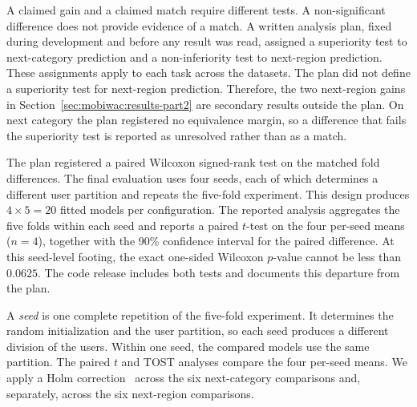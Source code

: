 A claimed gain and a claimed match require different tests. A non-significant difference does not provide evidence of a match. A written analysis plan, fixed during development and before any result was read, assigned a superiority test to next-category prediction and a non-inferiority test to next-region prediction. These assignments apply to each task across the datasets. The plan did not define a superiority test for next-region prediction. Therefore, the two next-region gains in Section~\ref{sec:mobiwac:results-part2} are secondary results outside the plan. On next category the plan registered no equivalence margin, so a difference that fails the superiority test is reported as unresolved rather than as a match.

The plan registered a paired Wilcoxon signed-rank test on the matched fold differences. The final evaluation uses four seeds, each of which determines a different user partition and repeats the five-fold experiment. This design produces $4\times5=20$ fitted models per configuration. The reported analysis aggregates the five folds within each seed and reports a paired $t$-test on the four per-seed means ($n{=}4$), together with the 90\% confidence interval for the paired difference. At this seed-level footing, the exact one-sided Wilcoxon $p$-value cannot be less than $0.0625$. The code release includes both tests and documents this departure from the plan.

A \emph{seed} is one complete repetition of the five-fold experiment. It determines the random initialization and the user partition, so each seed produces a different division of the users. Within one seed, the compared models use the same partition. The paired $t$ and TOST analyses compare the four per-seed means. We apply a Holm correction~\cite{holm1979} across the six next-category comparisons and, separately, across the six next-region comparisons.

